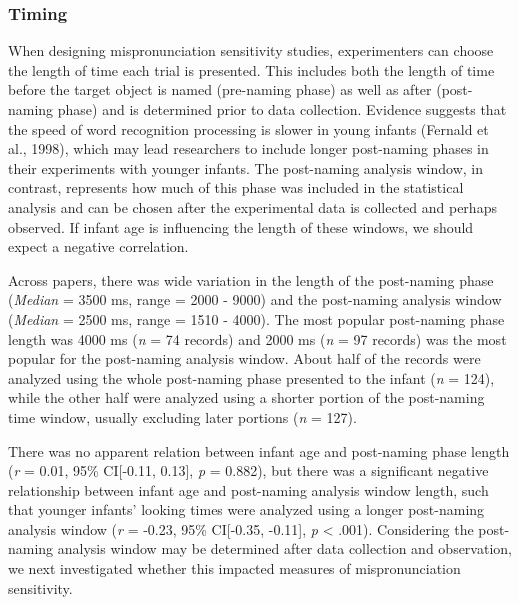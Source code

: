 \documentclass[
  man, noextraspace]{apa6}
\begin{document}
\hypertarget{timing}{%
\subsubsection{Timing}\label{timing}}

When designing mispronunciation sensitivity studies, experimenters can choose the length of time each trial is presented. This includes both the length of time before the target object is named (pre-naming phase) as well as after (post-naming phase) and is determined prior to data collection. Evidence suggests that the speed of word recognition processing is slower in young infants (Fernald et al., 1998), which may lead researchers to include longer post-naming phases in their experiments with younger infants. The post-naming analysis window, in contrast, represents how much of this phase was included in the statistical analysis and can be chosen after the experimental data is collected and perhaps observed. If infant age is influencing the length of these windows, we should expect a negative correlation.

Across papers, there was wide variation in the length of the post-naming phase (\emph{Median} = 3500 ms, range = 2000 - 9000) and the post-naming analysis window (\emph{Median} = 2500 ms, range = 1510 - 4000). The most popular post-naming phase length was 4000 ms (\emph{n} = 74 records) and 2000 ms (\emph{n} = 97 records) was the most popular for the post-naming analysis window. About half of the records were analyzed using the whole post-naming phase presented to the infant (\emph{n} = 124), while the other half were analyzed using a shorter portion of the post-naming time window, usually excluding later portions (\emph{n} = 127).

There was no apparent relation between infant age and post-naming phase length (\emph{r} = 0.01, 95\% CI{[}-0.11, 0.13{]}, \emph{p} = 0.882), but there was a significant negative relationship between infant age and post-naming analysis window length, such that younger infants' looking times were analyzed using a longer post-naming analysis window (\emph{r} = -0.23, 95\% CI{[}-0.35, -0.11{]}, \emph{p} \textless{} .001). Considering the post-naming analysis window may be determined after data collection and observation, we next investigated whether this impacted measures of mispronunciation sensitivity.
\end{document}
